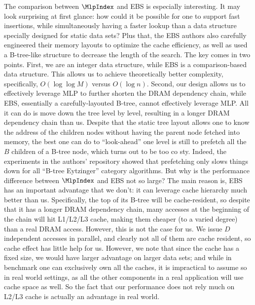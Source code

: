 \documentclass[11pt, usletter]{article}
\begin{document}
The comparison between $\MlpIndex$ and EBS is especially interesting. 
It may look surprising at first glance: how could it be possible for one to support fast insertions, 
while simultaneously having a faster lookup than a data structure specially designed for static data sets?
Plus that, the EBS authors also carefully engineered their memory layouts 
to optimize the cache efficiency, as well as used a B-tree-like structure to decrease the length of the search.
The key comes in two points. First, we are an integer data structure, while EBS is a comparison-based data structure. 
This allows us to achieve theoretically better complexity, specifically, $O(\log\log M)$ versus $O(\log n)$. 
Second, our design allows us to effectively leverage MLP to further shorten the DRAM dependency chain, 
while EBS, essentially a carefully-layouted B-tree, cannot effectively leverage MLP. 
All it can do is move down the tree level by level, resulting in a longer DRAM dependency chain than us. 
Despite that the static tree layout allows one to know the address of the children nodes without having 
the parent node fetched into memory, 
the best one can do to ``look-ahead'' one level is still to prefetch all the $B$ children of a B-tree node, 
which turns out to be too co sty. Indeed, the experiments in the authors' repository 
showed that prefetching only slows things down for all ``B-tree Eytzinger'' category algorithms.
But why is the performance difference between $\MlpIndex$ and EBS not so large? 
The main reason is, EBS has an important advantage that we don't: it can leverage cache hierarchy much better than us. 
Specifically, the top of its B-tree will be cache-resident, 
so despite that it has a longer DRAM dependency chain, many accesses at the beginning of the chain will hit L1/L2/L3 
cache, making them cheaper (to a varied degree) than a real DRAM access. 
However, this is not the case for us. We issue $D$ independent accesses in parallel, 
and clearly not all of them are cache resident, so cache effect has little help for us.
However, we note that since the cache has a fixed size, we would have larger advantage on larger data sets; 
and while in benchmark one can exclusively own all the caches, it is impractical to assume so in real world settings,
as all the other components in a real application will use cache space as well. 
So the fact that our performance does not rely much on L2/L3 cache is actually an advantage in real world.
\end{document}
